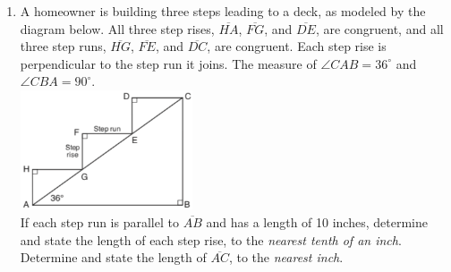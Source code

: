 \documentclass[12pt, twoside]{article}
\begin{document}
\begin{enumerate}
\newpage
    \item A homeowner is building three steps leading to a deck, as modeled by the diagram below. All three step rises, $\overline{HA}$,  $\overline{FG}$, and  $\overline{DE}$, are congruent, and all three step runs, $\overline{HG}$,  $\overline{FE}$, and  $\overline{DC}$, are congruent. Each step rise is perpendicular to the step run it joins. The measure of $\angle CAB = 36^\circ$ and $\angle CBA = 90^\circ$.\\[0.5cm]
      \includegraphics[width=0.4\textwidth]{steps_Aug2018-33.png}\\
    If each step run is parallel to $\overline{AB}$ and has a length of 10 inches, determine and state the length of each step rise, to the \emph{nearest tenth of an inch}.\\[3cm]
    Determine and state the length of $\overline{AC}$, to the \emph{nearest inch}.

\end{enumerate}
\end{document}
